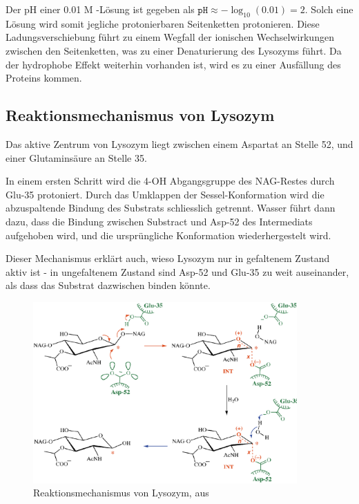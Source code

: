 \documentclass[a4paper,german]{scrreprt}
\begin{document}
Der pH einer 0.01 M -Lösung ist gegeben als $\texttt{pH} \approx
-\log_{10}(0.01) = 2$. Solch eine Lösung wird somit jegliche protonierbaren
Seitenketten protonieren. Diese Ladungsverschiebung führt zu einem Wegfall der
ionischen Wechselwirkungen zwischen den Seitenketten, was zu einer
Denaturierung des Lysozyms führt. Da der hydrophobe Effekt weiterhin vorhanden
ist, wird es zu einer Ausfällung des Proteins kommen.

\subsection{Reaktionsmechanismus von Lysozym}

Das aktive Zentrum von Lysozym liegt zwischen einem Aspartat an Stelle 52, und
einer Glutaminsäure an Stelle 35.

In einem ersten Schritt wird die 4-OH Abgangsgruppe des NAG-Restes durch Glu-35
protoniert. Durch das Umklappen der Sessel-Konformation wird die abzuspaltende
Bindung des Substrats schliesslich getrennt. Wasser führt dann dazu, dass die
Bindung zwischen Substract und Asp-52 des Intermediats aufgehoben wird, und die
ursprüngliche Konformation wiederhergestelt wird. \cite{lys}

Dieser Mechanismus erklärt auch, wieso Lysozym nur in gefaltenem Zustand aktiv
ist - in ungefaltenem Zustand sind Asp-52 und Glu-35 zu weit auseinander, als
dass das Substrat dazwischen binden könnte.

\begin{figure}[h]
	\centering
	\includegraphics[width=0.9\textwidth]{data/lys_mechanism}
	\caption{Reaktionsmechanismus von Lysozym, aus \cite{lys}}
	\label{fig:lys_mechanism}
\end{figure}
\end{document}

